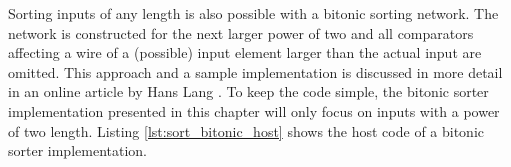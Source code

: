 Sorting inputs of any length is also possible with a bitonic sorting network. The network is constructed for the next larger power of two and all comparators affecting a wire of a (possible) input element larger than the actual input are omitted. This approach and a sample implementation is discussed in more detail in an online article by Hans Lang \cite{sort_bitonic_arbitrary_n}. To keep the code simple, the bitonic sorter implementation presented in this chapter will only focus on inputs with a power of two length.
Listing \ref{lst:sort_bitonic_host} shows the host code of a bitonic sorter implementation.



